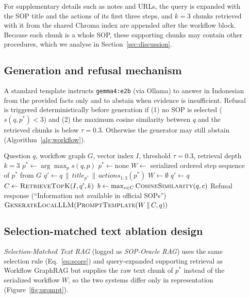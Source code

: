 \documentclass[preprint,10pt]{elsarticle}
\begin{document}
For supplementary details such as notes and URLs, the query is expanded with the SOP title and the actions of its first three steps, and $k=3$ chunks retrieved with it from the shared Chroma index are appended after the workflow block. Because each chunk is a whole SOP, these supporting chunks may contain other procedures, which we analyse in Section~\ref{sec:discussion}.

\subsection{Generation and refusal mechanism}
A standard template instructs \texttt{gemma4:e2b} (via Ollama) to answer in Indonesian from the provided facts only and to abstain when evidence is insufficient. Refusal is triggered deterministically before generation if (1) no SOP is selected ($s(q,p^\ast)<3$) and (2) the maximum cosine similarity between $q$ and the retrieved chunks is below $\tau=0.3$. Otherwise the generator may still abstain (Algorithm~\ref{alg:workflow}).

\begin{algorithm}[!htbp]
\caption{Execution pipeline of Process-Aware Workflow GraphRAG}
\label{alg:workflow}
\begin{algorithmic}[1]
\REQUIRE Question $q$, workflow graph $G$, vector index $I$, threshold $\tau = 0.3$, retrieval depth $k=3$
\STATE $p^\ast \leftarrow \arg\max_p s(q,p)$ 
  \STATE $p^\ast \leftarrow \text{none}$
\ENDIF
{}
  \STATE $W \leftarrow$ serialized ordered step sequence of $p^\ast$ from $G$
  \STATE $q' \leftarrow q \,\|\, \textit{title}_{p^\ast} \,\|\, \textit{actions}_{1:3}(p^\ast)$ 
\ELSE
  \STATE $W \leftarrow \emptyset$
  \STATE $q' \leftarrow q$ 
\ENDIF
\STATE $C \leftarrow \textsc{RetrieveTopK}(I, q', k)$
\STATE $b \leftarrow \max_{c \in C} \textsc{CosineSimilarity}(q, c)$
  \RETURN Refusal response (``Information not available in official SOPs'')
\ENDIF
\RETURN $\textsc{GenerateLocalLLM}(\textsc{PromptTemplate}(W \,\|\, C, q))$
\end{algorithmic}
\end{algorithm}

\subsection{Selection-matched text ablation design}
\label{sec:ablation-oracle}
\emph{Selection-Matched Text RAG} (logged as \emph{SOP-Oracle RAG}) uses the same selection rule (Eq.~\eqref{eq:score}) and query-expanded supporting retrieval as Workflow GraphRAG but supplies the raw text chunk of $p^\ast$ instead of the serialized workflow $W$, so the two systems differ only in representation (Figure~\ref{fig:prompt}).
\end{document}

